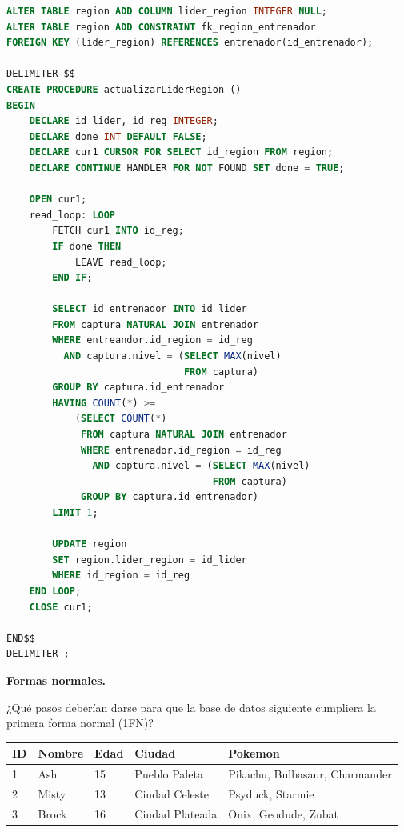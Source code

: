 \documentclass[12pt,a4paper,addpoints,answers]{exam}
\begin{document}
\begin{questions}
\begin{solution}
\begin{lstlisting}[language=SQL]
ALTER TABLE region ADD COLUMN lider_region INTEGER NULL;
ALTER TABLE region ADD CONSTRAINT fk_region_entrenador
FOREIGN KEY (lider_region) REFERENCES entrenador(id_entrenador);

DELIMITER $$
CREATE PROCEDURE actualizarLiderRegion ()
BEGIN
    DECLARE id_lider, id_reg INTEGER;
    DECLARE done INT DEFAULT FALSE;
    DECLARE cur1 CURSOR FOR SELECT id_region FROM region;
    DECLARE CONTINUE HANDLER FOR NOT FOUND SET done = TRUE;
    
    OPEN cur1;
    read_loop: LOOP
        FETCH cur1 INTO id_reg;
        IF done THEN
            LEAVE read_loop;
        END IF;
        
        SELECT id_entrenador INTO id_lider
        FROM captura NATURAL JOIN entrenador 
        WHERE entreandor.id_region = id_reg 
          AND captura.nivel = (SELECT MAX(nivel) 
                               FROM captura)
        GROUP BY captura.id_entrenador
        HAVING COUNT(*) >= 
            (SELECT COUNT(*) 
             FROM captura NATURAL JOIN entrenador 
             WHERE entrenador.id_region = id_reg 
               AND captura.nivel = (SELECT MAX(nivel) 
                                    FROM captura)
             GROUP BY captura.id_entrenador)
        LIMIT 1;
        
        UPDATE region
        SET region.lider_region = id_lider
        WHERE id_region = id_reg
    END LOOP;
    CLOSE cur1;
    
END$$
DELIMITER ;
\end{lstlisting}
\end{solution}

\newpage
\question[\half] \textbf{Formas normales.}

¿Qué pasos deberían darse para que la base de datos siguiente cumpliera la primera forma normal (1FN)?
    
\vspace{1em}

\begin{tabular}{lllll}
\hline
ID & Nombre & Edad & Ciudad & Pokemon \\
\hline
1 & Ash & 15 & Pueblo Paleta & Pikachu, Bulbasaur, Charmander \\
2 & Misty & 13 & Ciudad Celeste & Psyduck, Starmie \\
3 & Brock & 16 & Ciudad Plateada & Onix, Geodude, Zubat \\
\hline
\end{tabular}  


\end{questions}
\end{document}
